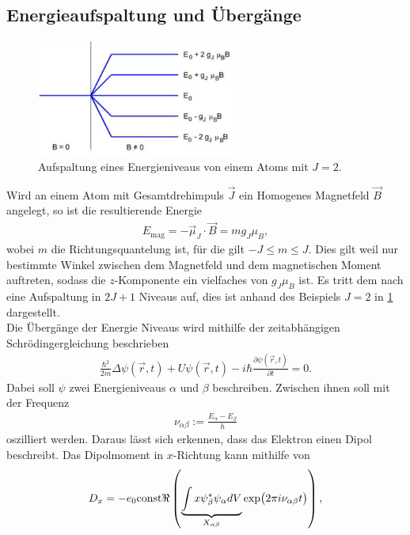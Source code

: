 \subsection{Energieaufspaltung und Übergänge}
\begin{figure}[h!]
	\centering
	\includegraphics[width=0.6\textwidth]{../Grafiken/fig_theo_Aufspaltung.pdf}
	\caption{Aufspaltung eines Energieniveaus von einem Atoms mit $J=2$. \cite{V27}}\label{fig:Theo_Aufspaltung}
\end{figure}
\noindent
Wird an einem Atom mit Gesamtdrehimpuls $\vec{J}$ ein Homogenes Magnetfeld $\vec{B}$ angelegt, so ist die resultierende Energie 
\begin{align}
	E_\text{mag}= -\vec{\mu}_J\cdot\vec{B}=mg_J\mu_B,
\end{align}
wobei $m$ die Richtungsquantelung ist, für die gilt $-J\le m\le J$.
Dies gilt weil nur bestimmte Winkel zwischen dem Magnetfeld und dem magnetischen Moment auftreten, sodass die $z$-Komponente ein vielfaches von $g_J\mu_B$ ist.
Es tritt dem nach eine Aufspaltung in $2J+1$ Niveaus auf, dies ist anhand des Beispiels $J=2$ in \cref{fig:Theo_Aufspaltung} dargestellt.\\
Die Übergänge der Energie Niveaus wird mithilfe der zeitabhängigen Schrödingergleichung beschrieben
\begin{align}
	\frac{\hbar^2}{2m}\Delta \psi(\vec{r},t)+U\psi(\vec{r},t)-i\hbar\frac{\partial \psi(\vec{r},t)}{\partial t}=0.
\end{align}
Dabei soll $\psi$ zwei Energieniveaus $\alpha$ und $\beta$ beschreiben.
Zwischen ihnen soll mit der Frequenz 
\begin{align}
	\nu_{\alpha\beta}:=\frac{E_\alpha-E_\beta}{h}
\end{align}
oszilliert werden.
Daraus lässt sich erkennen, dass das Elektron einen Dipol beschreibt. 
Das Dipolmoment in $x$-Richtung kann mithilfe von
\begin{align}
	D_x=-e_0\text{const}\real\left( \underbrace{\int x\psi^*_\beta\psi_\alpha dV}_{X_{\alpha\beta}}\exp(2\pi i\nu_{\alpha\beta}t) \right),
\end{align}
